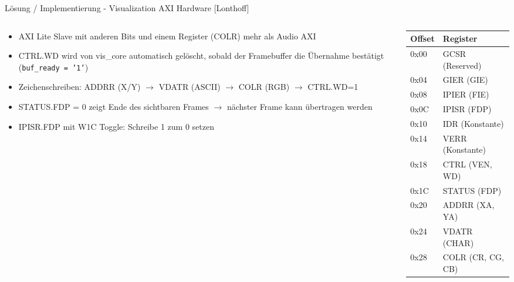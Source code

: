 \begin{frame}{Lösung / Implementierung - Visualization AXI Hardware [Lonthoff]}
    \begin{columns}[T]
        \begin{column}{0.65\textwidth}
            \begin{itemize}
                \item AXI Lite Slave mit anderen Bits und einem Register (COLR) mehr als Audio AXI
                \item CTRL.WD wird von vis\_core automatisch gelöscht, sobald der Framebuffer die Übernahme bestätigt (\texttt{buf\_ready = '1'})
                \item Zeichenschreiben: ADDRR (X/Y) $\to$ VDATR (ASCII) $\to$ COLR (RGB) $\to$ CTRL.WD=1
                \item STATUS.FDP = 0 zeigt Ende des sichtbaren Frames $\to$ nächster Frame kann übertragen werden
                \item IPISR.FDP mit W1C Toggle: Schreibe 1 zum 0 setzen
            \end{itemize}
        \end{column}
        \begin{column}{0.35\textwidth}
            \centering
            \footnotesize
            \begin{tabular}{ll}
                \toprule
                \textbf{Offset} & \textbf{Register} \\
                \midrule
                0x00 & GCSR (Reserved) \\
                0x04 & GIER (GIE) \\
                0x08 & IPIER (FIE) \\
                0x0C & IPISR (FDP) \\
                0x10 & IDR (Konstante) \\
                0x14 & VERR (Konstante) \\
                0x18 & CTRL (VEN, WD) \\
                0x1C & STATUS (FDP) \\
                0x20 & ADDRR (XA, YA) \\
                0x24 & VDATR (CHAR) \\
                0x28 & COLR (CR, CG, CB) \\
                \bottomrule
            \end{tabular}
        \end{column}
    \end{columns}
\end{frame}
